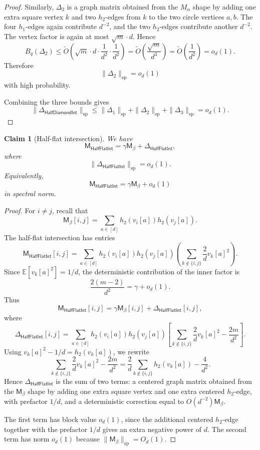 \documentclass[12pt]{article}
\def \E {\mathbb{E}}
\newtheorem{claim}[theorem]{Claim}
\newcommand{\cm}{\mathsf{M} }
\begin{document}
\begin{proof}
Similarly, \(\Delta_2\) is a graph matrix obtained from the \(M_\alpha\) shape by adding one
extra square vertex \(k\) and two \(h_2\)-edges from \(k\) to the two circle vertices \(a,b\). The
four \(h_1\)-edges again contribute \(d^{-2}\), and the two \(h_2\)-edges contribute another
\(d^{-2}\). The vertex factor is again at most \(\sqrt m\cdot d\). Hence
\[
    B_q(\Delta_2)
    \le
    \widetilde O\!\left(
        \sqrt m\cdot d\cdot \frac1{d^2}\cdot \frac1{d^2}
    \right)
    =
    \widetilde O\!\left(\frac{\sqrt m}{d^3}\right)
    =
    \widetilde O\!\left(\frac1{d^2}\right)
    =
    o_d(1).
\]
Therefore
\[
    \|\Delta_2\|_{\mathrm{sp}}=o_d(1)
\]
with high probability.

Combining the three bounds gives
\[
    \|\Delta_{\mathsf{HalfDiamondInt}}\|_{\mathrm{sp}}
    \le
    \|\Delta_1\|_{\mathrm{sp}}
    +
    \|\Delta_2\|_{\mathrm{sp}}
    +
    \|\Delta_3\|_{\mathrm{sp}}
    =
    o_d(1).
\]
\end{proof}

\begin{claim}[Half-flat intersection]
\label{clm:half-flat-int}
We have
\[
    \cm_{\mathsf{HalfFlatInt}}
    =
    \gamma \cm_\beta
    +
    \Delta_{\mathsf{HalfFlatInt}},
\]
where
\[
    \|\Delta_{\mathsf{HalfFlatInt}}\|_{\mathrm{sp}}
    =
    o_d(1).
\]
Equivalently,
\[
    \cm_{\mathsf{HalfFlatInt}}
    =
    \gamma \cm_\beta
    +
    o_d(1)
\]
in spectral norm.
\end{claim}

\begin{proof}
For \(i\neq j\), recall that
\[
    \cm_\beta[i,j]
    =
    \sum_{a\in[d]} h_2(v_i[a])h_2(v_j[a]).
\]
The half-flat intersection has entries
\[
    \cm_{\mathsf{HalfFlatInt}}[i,j]
    =
    \sum_{a\in[d]} h_2(v_i[a])h_2(v_j[a])
    \left(
        \sum_{k\notin\{i,j\}} \frac{2}{d}v_k[a]^2
    \right).
\]
Since \(\E[v_k[a]^2]=1/d\), the deterministic contribution of the inner factor is
\[
    \frac{2(m-2)}{d^2}
    =
    \gamma+o_d(1).
\]
Thus
\[
    \cm_{\mathsf{HalfFlatInt}}[i,j]
    =
    \gamma \cm_\beta[i,j]
    +
    \Delta_{\mathsf{HalfFlatInt}}[i,j],
\]
where
\[
    \Delta_{\mathsf{HalfFlatInt}}[i,j]
    =
    \sum_{a\in[d]} h_2(v_i[a])h_2(v_j[a])
    \left[
        \sum_{k\notin\{i,j\}} \frac{2}{d}v_k[a]^2
        -
        \frac{2m}{d^2}
    \right].
\]
Using \(v_k[a]^2-1/d=h_2(v_k[a])\), we rewrite
\[
    \sum_{k\notin\{i,j\}} \frac{2}{d}v_k[a]^2
    -
    \frac{2m}{d^2}
    =
    \frac{2}{d}
    \sum_{k\notin\{i,j\}} h_2(v_k[a])
    -
    \frac{4}{d^2}.
\]
Hence \(\Delta_{\mathsf{HalfFlatInt}}\) is the sum of two terms: a centered graph matrix obtained
from the \(\cm_\beta\) shape by adding one extra square vertex and one extra centered \(h_2\)-edge,
with prefactor \(1/d\), and a deterministic correction equal to \(O(d^{-2})\cm_\beta\).

The first term has block value \(o_d(1)\), since the additional centered \(h_2\)-edge together with
the prefactor \(1/d\) gives an extra negative power of \(d\). The second term has norm \(o_d(1)\)
because \(\|\cm_\beta\|_{\mathrm{sp}}=O_d(1)\). \end{proof}
\end{document}
